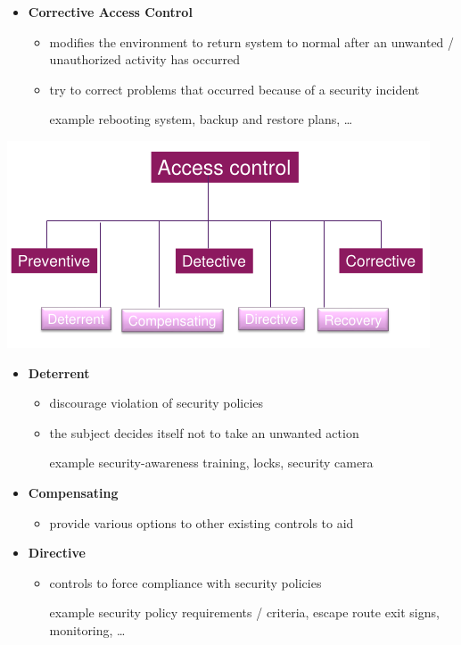 \documentclass[11pt,twoside,landscape]{article}
\begin{document}
\begin{multicols}{4}
\begin{itemize}
\item \textbf{Corrective Access Control}
\begin{itemize}
\item modifies the environment to return system to normal after an unwanted / unauthorized activity has occurred
\item try to correct problems that occurred because of a security incident
\item[{example}] rebooting system, backup and restore plans, \ldots{}
\end{itemize}
\end{itemize}


\begin{center}
\includegraphics[width=.9\linewidth]{img/other_access_control_types.png}
\end{center}

\begin{itemize}
\item \textbf{Deterrent}
\begin{itemize}
\item discourage violation of security policies
\item the subject decides itself not to take an unwanted action
\item[{example}] security-awareness training, locks, security camera
\end{itemize}

\item \textbf{Compensating}
\begin{itemize}
\item provide various options to other existing controls to aid
\end{itemize}

\item \textbf{Directive}
\begin{itemize}
\item controls to force compliance with security policies
\item[{example}] security policy requirements / criteria, escape route exit signs, monitoring, \ldots{}
\end{itemize}


\end{itemize}
\end{multicols}
\end{document}
